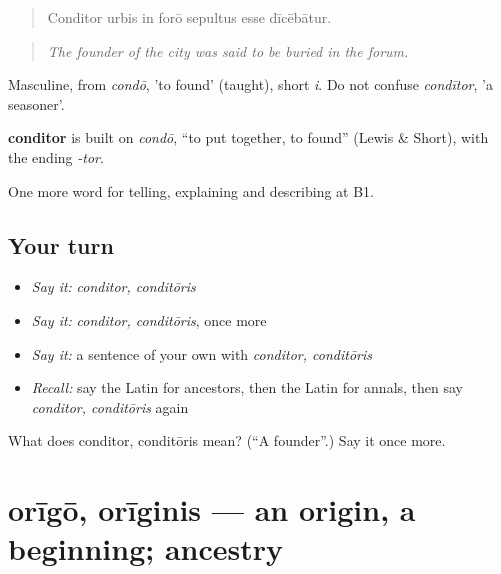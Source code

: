 \begin{quote}
Conditor urbis in forō sepultus esse dīcēbātur.
\end{quote}

\begin{quote}
\emph{The founder of the city was said to be buried in the forum.}
\end{quote}

Masculine, from \emph{condō}, 'to found' (taught), short \emph{i}. Do not confuse \emph{condītor}, 'a seasoner'.

\begin{cousinweb}
\textbf{conditor} is built on \emph{condō}, \textquotedblleft{}to put together, to found\textquotedblright{} (Lewis \& Short), with the ending \emph{-tor}.
\end{cousinweb}

\begin{grammarlens}[title={What you've built}]
One more word for telling, explaining and describing at B1.
\end{grammarlens}

\subsection*{Your turn}
\begin{itemize}
\raggedright
  \item \emph{Say it:} \emph{conditor, conditōris}
  \item \emph{Say it:} \emph{conditor, conditōris}, once more
  \item \emph{Say it:} a sentence of your own with \emph{conditor, conditōris}
  \item \emph{Recall:} say the Latin for ancestors, then the Latin for annals, then say \emph{conditor, conditōris} again
\end{itemize}

\begin{tcolorbox}[breakable,colback=teal!4,colframe=teal!35!black,title={Before you move on}]
What does conditor, conditōris mean? (\textquotedblleft{}A founder\textquotedblright{}.) Say it once more.
\end{tcolorbox}
\section[orīgō, orīginis]{orīgō, orīginis — an origin, a beginning; ancestry}

\label{lesson:LA-C344-origo}



